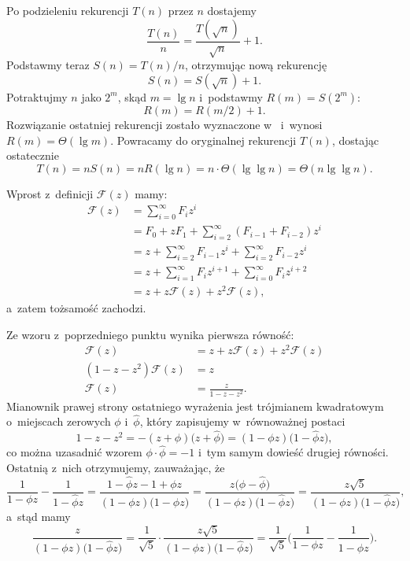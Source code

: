 \subproblem %
Po podzieleniu rekurencji $T(n)$ przez $n$ dostajemy
\[
	\frac{T(n)}{n} = \frac{T(\!\sqrt{n})}{\sqrt{n}}+1.
\]
Podstawmy teraz $S(n)=T(n)/n$, otrzymując nową rekurencję
\[
	S(n) = S(\!\sqrt{n})+1.
\]
Potraktujmy $n$ jako $2^m$, skąd $m=\lg n$ i~podstawmy $R(m)=S(2^m)$:
\[
	R(m) = R(m/2)+1.
\]
Rozwiązanie ostatniej rekurencji zostało wyznaczone w~ i~wynosi $R(m)=\Theta(\lg m)$. Powracamy do oryginalnej rekurencji $T(n)$, dostając ostatecznie
\[
	T(n) = nS(n) = nR(\lg n) = n\cdot\Theta(\lg\lg n) = \Theta(n\lg\lg n).
\]


\subproblem %
Wprost z~definicji $\mathcal{F}(z)$ mamy:
\begin{align*}
	\mathcal{F}(z) &= \sum_{i=0}^\infty F_iz^i \\
	&= F_0+zF_1+\sum_{i=2}^\infty (F_{i-1}+F_{i-2})z^i \\
	&= z+\sum_{i=2}^\infty F_{i-1}z^i+\sum_{i=2}^\infty F_{i-2}z^i \\
	&= z+\sum_{i=1}^\infty F_iz^{i+1}+\sum_{i=0}^\infty F_iz^{i+2} \\[2mm]
	&= z+z\mathcal{F}(z)+z^2\mathcal{F}(z),
\end{align*}
a~zatem tożsamość zachodzi.

\subproblem %
Ze wzoru z~poprzedniego punktu wynika pierwsza równość:
\begin{align*}
	\mathcal{F}(z) &= z+z\mathcal{F}(z)+z^2\mathcal{F}(z) \\
	(1-z-z^2)\mathcal{F}(z) &= z \\
	\mathcal{F}(z) &= \frac{z}{1-z-z^2}.
\end{align*}
Mianownik prawej strony ostatniego wyrażenia jest trójmianem kwadratowym o~miejscach zerowych $\phi$ i~$\widehat\phi$, który zapisujemy w~równoważnej postaci
\[
	1-z-z^2 = -(z+\phi)\bigl(z+\widehat\phi\bigr) = (1-\phi z)\bigl(1-\widehat\phi z\bigr),
\]
co można uzasadnić wzorem $\phi\cdot\widehat\phi=-1$ i~tym samym dowieść drugiej równości. Ostatnią z~nich otrzymujemy, zauważając, że
\[
	\frac{1}{1-\phi z}-\frac{1}{1-\widehat\phi z} = \frac{1-\widehat\phi z-1+\phi z}{(1-\phi z)\bigl(1-\widehat\phi z\bigr)} = \frac{z\bigl(\phi-\widehat\phi\bigr)}{(1-\phi z)\bigl(1-\widehat\phi z\bigr)} = \frac{z\sqrt{5}}{(1-\phi z)\bigl(1-\widehat\phi z\bigr)},
\]
a~stąd mamy
\[
	\frac{z}{(1-\phi z)\bigl(1-\widehat\phi z\bigr)} = \frac{1}{\sqrt{5}}\cdot\frac{z\sqrt{5}}{(1-\phi z)\bigl(1-\widehat\phi z\bigr)} = \frac{1}{\sqrt{5}}\biggl(\frac{1}{1-\phi z}-\frac{1}{1-\widehat\phi z}\biggr).
\]


